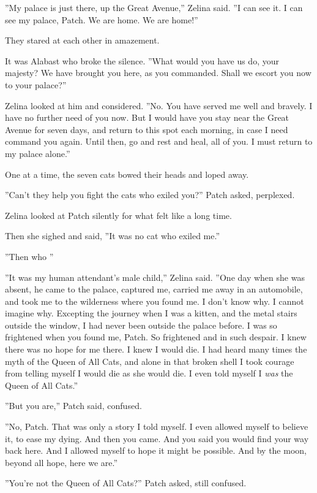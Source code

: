 \documentclass[12pt]{book}
\begin{document}
''My palace is just there, up the Great Avenue,'' Zelina said. ''I can see it. I can see my palace, Patch. We are home. We are home!''\par
They stared at each other in amazement.\par
It was Alabast who broke the silence. ''What would you have us do, your majesty? We have brought you here, as you commanded. Shall we escort you now to your palace?''\par
Zelina looked at him and considered. ''No. You have served me well and bravely. I have no further need of you now. But I would have you stay near the Great Avenue for seven days, and return to this spot each morning, in case I need command you again. Until then, go and rest and heal, all of you. I must return to my palace alone.''\par
One at a time, the seven cats bowed their heads and loped away.\par
''Can't they help you fight the cats who exiled you?'' Patch asked, perplexed.\par
Zelina looked at Patch silently for what felt like a long time.\par
Then she sighed and said, ''It was no cat who exiled me.''\par
 ''Then who %
''\par
 ''It was my human attendant's male child,'' Zelina said. ''One day when she was absent, he came to the palace, captured me, carried me away in an automobile, and took me to the wilderness where you found me. I don't know why. I cannot imagine why. Excepting the journey when I was a kitten, and the metal stairs outside the window, I had never been outside the palace before. I was so frightened when you found me, Patch. So frightened and in such despair. I knew there was no hope for me there. I knew I would die. I had heard many times the myth of the Queen of All Cats, and alone in that broken shell I took courage from telling myself I would die as she would die. I even told myself I {\it was} the Queen of All Cats.''\par
 ''But you are,'' Patch said, confused.\par
 ''No, Patch. That was only a story I told myself. I even allowed myself to believe it, to ease my dying. And then you came. And you said you would find your way back here. And I allowed myself to hope it might be possible. And by the moon, beyond all hope, here we are.''\par
 ''You're not the Queen of All Cats?'' Patch asked, still confused.\par
\end{document}

